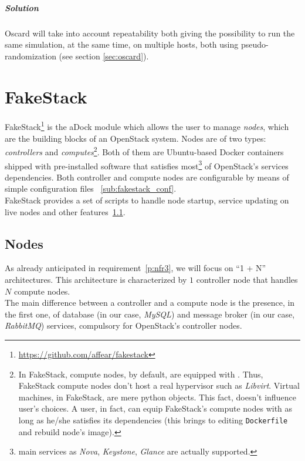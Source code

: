 \subparagraph{Solution} Oscard will take into account repeatability both giving the possibility to run the same simulation, at the same time, on multiple hosts, both using pseudo-randomization (see section \ref{sec:oscard}).


\section{FakeStack}
\label{sec:fakestack}
FakeStack\footnote{\url{https://github.com/affear/fakestack}} is the aDock module which allows the user to manage \textit{nodes}, which are the building blocks of an OpenStack system. Nodes are of two types: \textit{controllers} and \textit{computes}\footnote{In FakeStack, compute nodes, by default, are equipped with . Thus, FakeStack compute nodes don't host a real hypervisor such as \textit{Libvirt}. Virtual machines, in FakeStack, are mere python objects. This fact, doesn't influence user's choices. A user, in fact, can equip FakeStack's compute nodes with  as long as he/she satisfies its dependencies (this brings to editing \texttt{Dockerfile} and rebuild node's image).}. Both of them are Ubuntu-based Docker containers shipped with pre-installed software that satisfies most\footnote{main services as \textit{Nova}, \textit{Keystone}, \textit{Glance} are actually supported.} of OpenStack's services dependencies. Both controller and compute nodes are configurable by means of simple configuration files ~\ref{sub:fakestack_conf}.\\
FakeStack provides a set of scripts to handle node startup, service updating on live nodes and other features~\ref{sub:fakestack_scripts}.

\subsection{Nodes}
\label{sub:fakestack_scripts}
As already anticipated in requirement~\ref{p:nfr3}, we will focus on ``1 + N'' architectures. This architecture is characterized by $1$ controller node that handles $N$ compute nodes.\\
The main difference between a controller and a compute node is the presence, in the first one, of database (in our case, \textit{MySQL}) and message broker (in our case, \textit{RabbitMQ}) services, compulsory for OpenStack's controller nodes.

